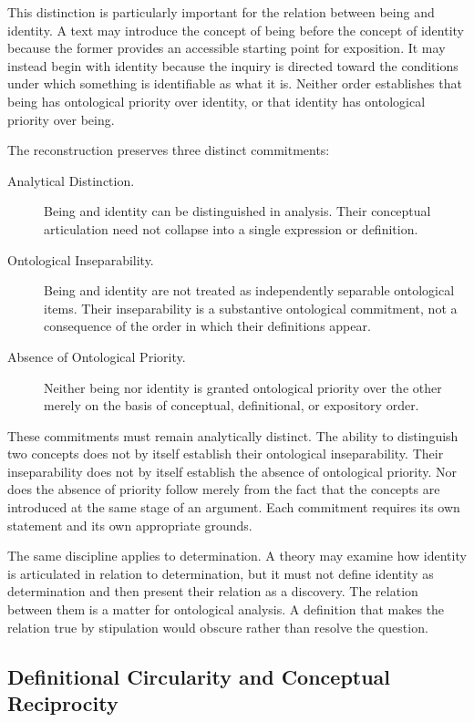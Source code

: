 This distinction is particularly important for the relation between
being and identity. A text may introduce the concept of being before
the concept of identity because the former provides an accessible
starting point for exposition. It may instead begin with identity
because the inquiry is directed toward the conditions under which
something is identifiable as what it is. Neither order establishes
that being has ontological priority over identity, or that identity
has ontological priority over being.

The reconstruction preserves three distinct commitments:

\begin{description}
  \item[Analytical Distinction.]
  Being and identity can be distinguished in analysis. Their
  conceptual articulation need not collapse into a single expression
  or definition.

  \item[Ontological Inseparability.]
  Being and identity are not treated as independently separable
  ontological items. Their inseparability is a substantive
  ontological commitment, not a consequence of the order in which
  their definitions appear.

  \item[Absence of Ontological Priority.]
  Neither being nor identity is granted ontological priority over
  the other merely on the basis of conceptual, definitional, or
  expository order.
\end{description}

These commitments must remain analytically distinct. The ability to
distinguish two concepts does not by itself establish their
ontological inseparability. Their inseparability does not by itself
establish the absence of ontological priority. Nor does the absence
of priority follow merely from the fact that the concepts are
introduced at the same stage of an argument. Each commitment requires
its own statement and its own appropriate grounds.

The same discipline applies to determination. A theory may examine
how identity is articulated in relation to determination, but it
must not define identity as determination and then present their
relation as a discovery. The relation between them is a matter for
ontological analysis. A definition that makes the relation true by
stipulation would obscure rather than resolve the question.

\subsection{Definitional Circularity and Conceptual Reciprocity}

